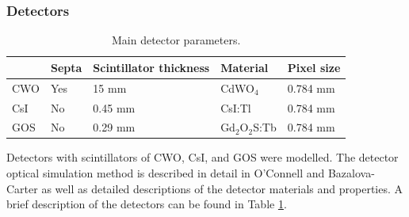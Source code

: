 \subsubsection{Detectors}

\begin{table}[h!]
\begin{center}
\caption{Main detector parameters.}
\label{tab:det_params}
\begin{tabular}{lllll}
 \hline
       & Septa & Scintillator thickness & Material & Pixel size \\  \hline
CWO & Yes   & 15 mm \cite{Star-Lack2015AImaging} & CdWO$_4$ & 0.784 mm\\
CsI   & No    & 0.45 mm \cite{Sharma2012EffectiveGlasses}     &  CsI:Tl & 0.784 mm \\
GOS   & No     & 0.29 mm     & Gd$_2$O$_2$S:Tb & 0.784 mm 
\end{tabular}
\end{center}
\end{table}

Detectors with scintillators of CWO, CsI, and GOS were modelled. The detector optical simulation method is described in detail in O'Connell and Bazalova-Carter \cite{OConnell2021FastCAT:Simulation} as well as detailed descriptions of the detector materials and properties. A brief description of the detectors can be found in Table \ref{tab:det_params}.



